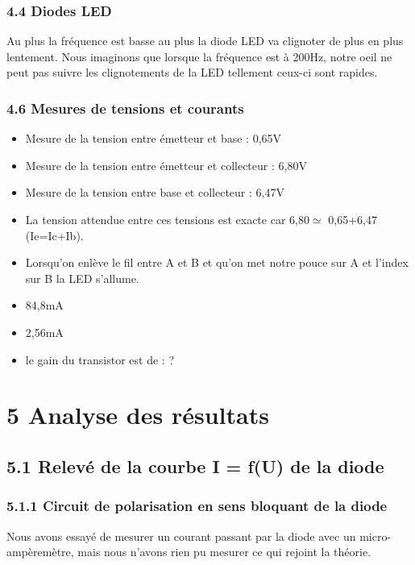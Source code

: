\documentclass{report}
\begin{document}
\subsubsection*{4.4 Diodes LED}
Au plus la fréquence est basse au plus la diode LED va clignoter de plus en plus lentement.
Nous imaginons que lorsque la fréquence est à 200Hz, notre oeil ne peut pas suivre les clignotements de la LED tellement ceux-ci sont rapides.

\subsubsection*{4.6 Mesures de tensions et courants}

\begin{itemize}
\item Mesure de la tension entre émetteur et base : 0,65V
\item Mesure de la tension entre émetteur et collecteur : 6,80V
\item Mesure de la tension entre base et collecteur : 6,47V
\item La tension attendue entre ces tensions est exacte car 6,80$\simeq$ 0,65+6,47 (Ie=Ic+Ib).
\item Lorsqu'on enlève le fil entre A et B et qu'on met notre pouce sur A et l'index sur B la LED s'allume.
\item 84,8mA
\item 2,56mA
\item le gain du transistor est de : ?
\end{itemize}

\section*{5 Analyse des résultats}

\subsection*{5.1 Relev\'e de la courbe I = f(U) de la diode}

\subsubsection*{5.1.1 Circuit de polarisation en sens bloquant de la diode}

Nous avons essayé de mesurer un courant passant par la diode avec un micro-amp\`erem\`etre, mais nous n'avons rien pu mesurer ce qui rejoint la théorie.
\end{document}
